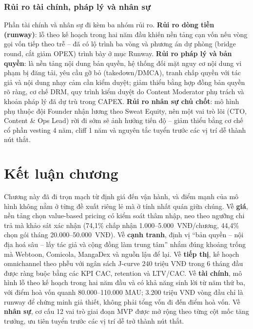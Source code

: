 \subsubsection{Rủi ro tài chính, pháp lý và nhân sự}

Phần tài chính và nhân sự đi kèm ba nhóm rủi ro. \textbf{Rủi ro dòng tiền (runway)}: lỗ theo kế hoạch trong hai năm đầu khiến nền tảng cạn vốn nếu vòng gọi vốn tiếp theo trễ -- đã có lộ trình ba vòng và phương án dự phòng (bridge round, cắt giảm OPEX) trình bày ở mục Runway. \textbf{Rủi ro pháp lý và bản quyền}: là nền tảng nội dung bản quyền, hệ thống đối mặt nguy cơ nội dung vi phạm bị đăng tải, yêu cầu gỡ bỏ (takedown/DMCA), tranh chấp quyền với tác giả và nội dung nhạy cảm cần kiểm duyệt; giảm thiểu bằng hợp đồng bản quyền rõ ràng, cơ chế DRM, quy trình kiểm duyệt do Content Moderator phụ trách và khoản pháp lý đã dự trù trong CAPEX. \textbf{Rủi ro nhân sự chủ chốt}: mô hình phụ thuộc đội Founder nhận lương theo Sweat Equity, nên một vai trò lõi (CTO, Content \& Ops Lead) rời đi sớm sẽ ảnh hưởng tiến độ -- giảm thiểu bằng cơ chế cổ phần vesting 4 năm, cliff 1 năm và nguyên tắc tuyển trước các vị trí dễ thành nút thắt.

\section{Kết luận chương}

Chương này đã đi trọn mạch từ định giá đến vận hành, và điểm mạnh của mô hình không nằm ở từng đề xuất riêng lẻ mà ở tính nhất quán giữa chúng. Về \textbf{giá}, nền tảng chọn value-based pricing có kiểm soát thâm nhập, neo theo ngưỡng chi trả mà khảo sát xác nhận (74,1\% chấp nhận 1.000--5.000~VNĐ/chương, 44,4\% chọn gói tháng 20.000--50.000~VNĐ). Về \textbf{cạnh tranh}, định vị ``bản quyền -- nội địa hoá sâu -- lấy tác giả và cộng đồng làm trung tâm'' nhắm đúng khoảng trống mà Webtoon, Comicola, MangaDex và nguồn lậu để lại. Về \textbf{tiếp thị}, kế hoạch omnichannel theo phễu với ngân sách J-curve 240 triệu VNĐ trong 6 tháng đầu được ràng buộc bằng các KPI CAC, retention và LTV/CAC. Về \textbf{tài chính}, mô hình lỗ theo kế hoạch trong hai năm đầu và có khả năng sinh lời từ năm thứ ba, với điểm hoà vốn quanh 80.000--110.000 MAU; 3.200 triệu VNĐ vòng đầu chỉ là runway để chứng minh giả thiết, không phải tổng vốn đi đến điểm hoà vốn. Về \textbf{nhân sự}, cơ cấu 12 vai trò giai đoạn MVP được mở rộng theo từng cột mốc tăng trưởng, ưu tiên tuyển trước các vị trí dễ trở thành nút thắt.

